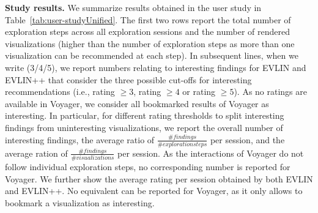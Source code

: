     \begin{table}[t]
 \centering
 \caption{Comparison between EVLIN, EVLIN++, and Voyager}
 \label{tab:user-studyUnified}
 \end{table}
 
 \noindent \textbf{Study results.} We summarize results obtained in the user study in Table~\ref{tab:user-studyUnified}. The first two rows report the total number of exploration steps across all exploration sessions and the number of rendered visualizations (higher than the number of exploration steps as more than one visualization can be recommended at each step). In subsequent lines, when we write (3/4/5), we report numbers relating to interesting findings for EVLIN and EVLIN++ that consider the three possible cut-offs for interesting recommendations (i.e., rating $\geq 3$, rating $\geq 4$ or rating $\geq 5$). As no ratings are available in Voyager, we consider all bookmarked results of Voyager as interesting. In particular, for different rating thresholds to split interesting findings from uninteresting visualizations, we report the overall number of interesting findings, the average ratio of $\frac{\#findings}{ \#exploration steps}$  per session, and the average ration of $\frac{\#findings}{ \#visualizations}$ per session.  As the interactions of Voyager do not follow individual exploration steps, no corresponding number is reported for Voyager. We further show the average rating per session obtained by both EVLIN and EVLIN++. No equivalent can be reported for Voyager, as it only allows to bookmark a visualization as interesting.



